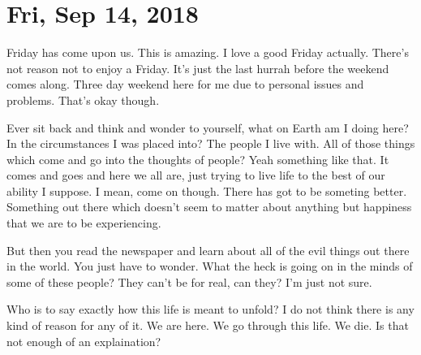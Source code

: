 \section{Fri, Sep 14, 2018}

Friday has come upon us. This is amazing. I love a good Friday actually. There's not
reason not to enjoy a Friday. It's just the last hurrah before the weekend comes
along. Three day weekend here for me due to personal issues and problems. That's okay
though.

Ever sit back and think and wonder to yourself, what on Earth am I doing here? In the
circumstances I was placed into? The people I live with. All of those things which
come and go into the thoughts of people? Yeah something like that. It comes and goes
and here we all are, just trying to live life to the best of our ability I suppose. I
mean, come on though. There has got to be someting better. Something out there which
doesn't seem to matter about anything but happiness that we are to be experiencing.

But then you read the newspaper and learn about all of the evil things out there in
the world. You just have to wonder. What the heck is going on in the minds of some of
these people? They can't be for real, can they? I'm just not sure.

Who is to say exactly how this life is meant to unfold? I do not think there is any
kind of reason for any of it. We are here. We go through this life. We die. Is that
not enough of an explaination?